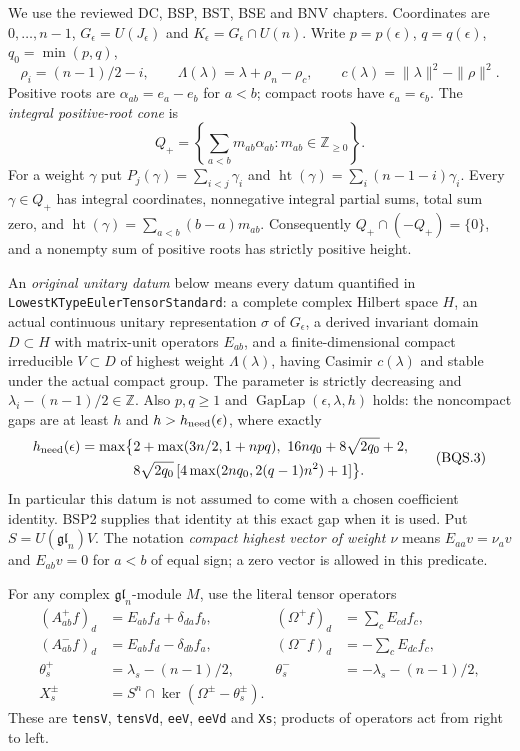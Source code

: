 \documentclass[11pt,a4paper]{article}
\numberwithin{equation}{section}
\theoremstyle{remark}\newtheorem{remark}[theorem]{Remark}
\begin{document}
We use the reviewed DC, BSP, BST, BSE and BNV chapters.  Coordinates are
$0,\ldots,n-1$, $G_\epsilon=U(J_\epsilon)$ and
$K_\epsilon=G_\epsilon\cap U(n)$.  Write $p=p(\epsilon)$, $q=q(\epsilon)$,
$q_0=\min(p,q)$,
\[
 \rho_i=(n-1)/2-i,\qquad
 \Lambda(\lambda)=\lambda+\rho_n-\rho_c,\qquad
 c(\lambda)=\|\lambda\|^2-\|\rho\|^2.
 \tag{BQS.1}
\]
Positive roots are $\alpha_{ab}=e_a-e_b$ for $a<b$; compact roots have
$\epsilon_a=\epsilon_b$.  The \emph{integral positive-root cone} is
\[
 Q_+=\left\{\sum_{a<b}m_{ab}\alpha_{ab}:m_{ab}\in\mathbb Z_{\ge0}\right\}.
 \tag{BQS.2}
\]
For a weight $\gamma$ put $P_j(\gamma)=\sum_{i<j}\gamma_i$ and
$\operatorname{ht}(\gamma)=\sum_i(n-1-i)\gamma_i$.
Every $\gamma\in Q_+$ has integral coordinates, nonnegative integral
partial sums, total sum zero, and
$\operatorname{ht}(\gamma)=\sum_{a<b}(b-a)m_{ab}$.
Consequently $Q_+\cap(-Q_+)=\{0\}$, and a nonempty sum of positive
roots has strictly positive height.

An \emph{original unitary datum} below means every datum quantified in
\texttt{LowestKTypeEuler\allowbreak{}TensorStandard}: a complete complex Hilbert space
$H$, an actual continuous unitary representation $\sigma$ of $G_\epsilon$,
a derived invariant domain $D\subset H$ with matrix-unit operators
$E_{ab}$, and a finite-dimensional compact irreducible
$V\subset D$ of highest weight $\Lambda(\lambda)$, having Casimir
$c(\lambda)$ and stable under the actual compact group.  The parameter is
strictly decreasing and
$\lambda_i-(n-1)/2\in\mathbb Z$.  Also $p,q\ge1$ and
$\operatorname{GapLap}(\epsilon,\lambda,h)$ holds: the noncompact gaps
are at least $h$ and $h>h_{\rm need}(\epsilon)$, where exactly
\[
\begin{split}
h_{\rm need}(\epsilon)=\max\bigl\{&
2+\max(3n/2,1+npq),\
16nq_0+8\sqrt{2q_0}+2,\\
&8\sqrt{2q_0}\,[4\max(2nq_0,2(q-1)n^2)+1]\bigr\}.
\end{split}
\tag{BQS.3}
\]
In particular this datum is not assumed to come with a chosen coefficient
identity.  BSP2 supplies that identity at this exact gap when it is used.
Put $S=U(\mathfrak{gl}_n)V$.  The notation \emph{compact highest vector
of weight $\nu$} means $E_{aa}v=\nu_av$ and $E_{ab}v=0$ for
$a<b$ of equal sign; a zero vector is allowed in this predicate.

For any complex $\mathfrak{gl}_n$-module $M$, use the literal tensor
operators
\[
\begin{aligned}
 (A^+_{ab}f)_d&=E_{ab}f_d+\delta_{da}f_b,&
 (\Omega^+f)_d&=\sum_cE_{cd}f_c,\\
 (A^-_{ab}f)_d&=E_{ab}f_d-\delta_{db}f_a,&
 (\Omega^-f)_d&=-\sum_cE_{dc}f_c,\\
 \theta_s^+&=\lambda_s-(n-1)/2,&
 \theta_s^-&=-\lambda_s-(n-1)/2,\\
 X_s^\pm&=S^n\cap\ker(\Omega^\pm-\theta_s^\pm).
\end{aligned}
\tag{BQS.4}
\]
These are \texttt{tens\allowbreak V}, \texttt{tens\allowbreak Vd}, \texttt{ee\allowbreak V},
\texttt{ee\allowbreak Vd} and \texttt{Xs}; products of operators act from right to
left.
\end{document}
